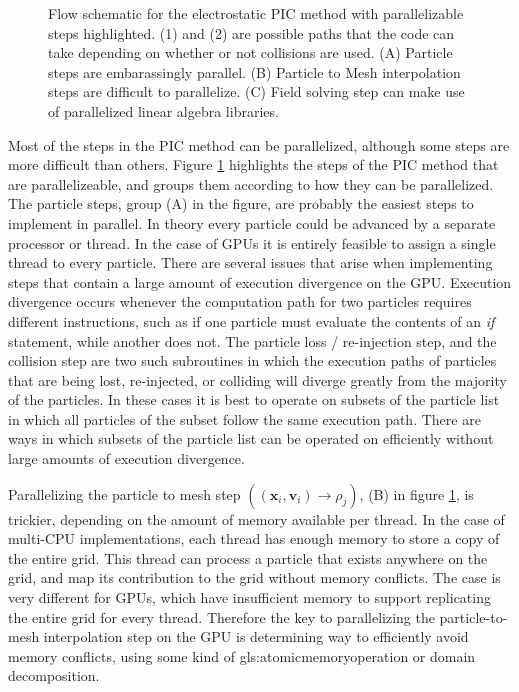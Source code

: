 \begin{figure}
\begin{center}

\end{center}
\caption[Parallization opportunities in the PIC method]{Flow schematic for the electrostatic PIC method with parallelizable steps highlighted. (1) and (2) are possible paths that the code can take depending on whether or not collisions are used. (A) Particle steps are embarassingly parallel. (B) Particle to Mesh interpolation steps are difficult to parallelize. (C) Field solving step can make use of parallelized linear algebra libraries.}
\label{fig:pic_flowchart_parallel}
\end{figure}

Most of the steps in the PIC method can be parallelized, although some steps are more difficult than others. Figure \ref{fig:pic_flowchart_parallel} highlights the steps of the PIC method that are parallelizeable, and groups them according to how they can be parallelized. The particle steps, group (A) in the figure, are probably the easiest steps to implement in parallel. In theory every particle could be advanced by a separate processor or thread. In the case of GPUs it is entirely feasible to assign a single thread to every particle. There are several issues that arise when implementing steps that contain a large amount of execution divergence on the GPU. 
Execution divergence occurs whenever the computation path for two particles requires different instructions, such as if one particle must evaluate the contents of an \emph{if} statement, while another does not.
The particle loss / re-injection step, and the collision step are two such subroutines in which the execution paths of particles that are being lost, re-injected, or colliding will diverge greatly from the majority of the particles. In these cases it is best to operate on subsets of the particle list in which all particles of the subset follow the same execution path. There are ways in which subsets of the particle list can be operated on efficiently without large amounts of execution divergence. 

Parallelizing the particle to mesh step $((\mathbf{x}_i,\mathbf{v}_i)\rightarrow \rho_j)$, (B) in figure \ref{fig:pic_flowchart_parallel}, is trickier, depending on the amount of memory available per thread. In the case of multi-CPU implementations, each thread has enough memory to store a copy of the entire grid. This thread can process a particle that exists anywhere on the grid, and map its contribution to the grid without memory conflicts. The case is very different for GPUs, which have insufficient memory to support replicating the entire grid for every thread. Therefore the key to parallelizing the particle-to-mesh interpolation step on the GPU is determining way to efficiently avoid memory conflicts, using some kind of \gls{gls:atomicmemoryoperation} or domain decomposition. 

